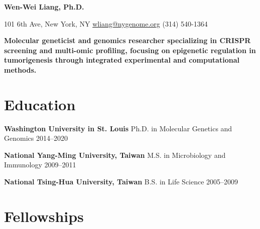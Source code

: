 \documentclass[letterpaper,11pt]{cv}
\begin{document}

\begin{minipage}[b][][c]{35em}
    \lightsourceserif\Huge\bfseries\color{color-title}
    Wen-Wei Liang, Ph.D.
\end{minipage}%
\hfill
\hspace{1em}
\begin{minipage}[b][][b]{11em}
    \raggedleft
    \small
    101 6th Ave, New York, NY \hfill
    \href{mailto:wliang@nygenome.org}{wliang@nygenome.org} \hfill
    (314) 540-1364
\end{minipage}

\vspace{2ex}

{
    \small\lightsourceserif\bfseries\color{color-title}
    Molecular geneticist and genomics researcher specializing in CRISPR screening and multi-omic profiling, focusing on epigenetic regulation in tumorigenesis through integrated experimental and computational methods.\par
}

\section{Education}

\begin{entrylist}

\item \textbf{Washington University in St. Louis} \hspace{2.45em} Ph.D. in Molecular Genetics and Genomics \hfill
    2014--2020 \\

\item \textbf{National Yang-Ming University, Taiwan} \hspace{0.5em} M.S. in Microbiology and Immunology \hfill
    2009--2011 \\

\item \textbf{National Tsing-Hua University, Taiwan} \hspace{0.72em} B.S. in Life Science \hfill
    2005--2009 \\

\end{entrylist}

\section{Fellowships}
\end{document}
